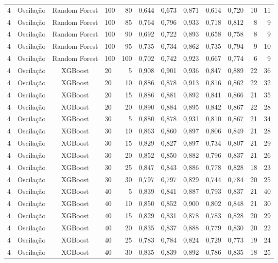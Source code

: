 \begin{longtable}{ccclrrrrrrrr}
4 & Oscilação & Random Forest & 100 & 80 & 0,644 & 0,673 & 0,871 & 0,614 & 0,720 & 10 & 11 \\
4 & Oscilação & Random Forest & 100 & 85 & 0,764 & 0,796 & 0,933 & 0,718 & 0,812 & 8 & 9 \\
4 & Oscilação & Random Forest & 100 & 90 & 0,692 & 0,722 & 0,893 & 0,658 & 0,758 & 8 & 9 \\
4 & Oscilação & Random Forest & 100 & 95 & 0,735 & 0,734 & 0,862 & 0,735 & 0,794 & 9 & 10 \\
4 & Oscilação & Random Forest & 100 & 100 & 0,702 & 0,742 & 0,923 & 0,667 & 0,774 & 6 & 9 \\
4 & Oscilação & XGBoost & 20 & 5 & 0,908 & 0,901 & 0,936 & 0,847 & 0,889 & 22 & 36 \\
4 & Oscilação & XGBoost & 20 & 10 & 0,886 & 0,878 & 0,913 & 0,816 & 0,862 & 22 & 32 \\
4 & Oscilação & XGBoost & 20 & 15 & 0,886 & 0,881 & 0,892 & 0,841 & 0,866 & 21 & 35 \\
4 & Oscilação & XGBoost & 20 & 20 & 0,890 & 0,884 & 0,895 & 0,842 & 0,867 & 22 & 28 \\
4 & Oscilação & XGBoost & 30 & 5 & 0,880 & 0,878 & 0,931 & 0,810 & 0,867 & 21 & 34 \\
4 & Oscilação & XGBoost & 30 & 10 & 0,863 & 0,860 & 0,897 & 0,806 & 0,849 & 21 & 28 \\
4 & Oscilação & XGBoost & 30 & 15 & 0,829 & 0,827 & 0,897 & 0,734 & 0,807 & 21 & 29 \\
4 & Oscilação & XGBoost & 30 & 20 & 0,852 & 0,850 & 0,882 & 0,796 & 0,837 & 21 & 26 \\
4 & Oscilação & XGBoost & 30 & 25 & 0,847 & 0,843 & 0,886 & 0,778 & 0,828 & 18 & 23 \\
4 & Oscilação & XGBoost & 30 & 30 & 0,797 & 0,797 & 0,829 & 0,744 & 0,784 & 20 & 25 \\
4 & Oscilação & XGBoost & 40 & 5 & 0,839 & 0,841 & 0,887 & 0,793 & 0,837 & 21 & 40 \\
4 & Oscilação & XGBoost & 40 & 10 & 0,850 & 0,852 & 0,900 & 0,802 & 0,848 & 21 & 30 \\
4 & Oscilação & XGBoost & 40 & 15 & 0,829 & 0,831 & 0,878 & 0,783 & 0,828 & 20 & 29 \\
4 & Oscilação & XGBoost & 40 & 20 & 0,835 & 0,837 & 0,888 & 0,779 & 0,830 & 20 & 22 \\
4 & Oscilação & XGBoost & 40 & 25 & 0,783 & 0,784 & 0,824 & 0,729 & 0,773 & 19 & 24 \\
4 & Oscilação & XGBoost & 40 & 30 & 0,835 & 0,839 & 0,892 & 0,786 & 0,835 & 18 & 25 \\

\end{longtable}
